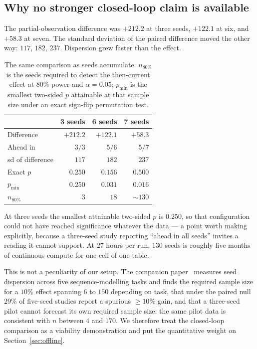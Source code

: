 \documentclass[11pt]{article}
\begin{document}
\subsection{Why no stronger closed-loop claim is available}
\label{sec:power}
The partial-observation difference was $+212.2$ at three seeds,
$+122.1$ at six, and $+58.3$ at seven. The standard deviation of the
paired difference moved the other way: $117$, $182$, $237$. Dispersion
grew faster than the effect.

\begin{table}[h]\centering\small
\caption{The same comparison as seeds accumulate. $n_{80\%}$ is the
seeds required to detect the then-current effect at $80\%$ power and
$\alpha = 0.05$; $p_{\min}$ is the smallest two-sided $p$ attainable at
that sample size under an exact sign-flip permutation test.}
\begin{tabular}{lrrr}
\toprule
& 3 seeds & 6 seeds & 7 seeds \\
\midrule
Difference      & $+212.2$ & $+122.1$ & $+58.3$ \\
Ahead in        & $3/3$    & $5/6$    & $5/7$ \\
sd of difference& $117$    & $182$    & $237$ \\
Exact $p$       & $0.250$  & $0.156$  & $0.500$ \\
$p_{\min}$      & $0.250$  & $0.031$  & $0.016$ \\
$n_{80\%}$      & $3$      & $18$     & $\sim\!130$ \\
\bottomrule
\end{tabular}
\end{table}

At three seeds the smallest attainable two-sided $p$ is $0.250$, so that
configuration could not have reached significance whatever the data ---
a point worth making explicitly, because a three-seed study reporting
``ahead in all seeds'' invites a reading it cannot support. At $27$
hours per run, $130$ seeds is roughly five months of continuous compute
for one cell of one table.

This is not a peculiarity of our setup. The companion
paper~\cite{papera} measures seed dispersion across five sequence-modelling
tasks and finds the required sample size for a $10\%$ effect spanning
$6$ to $150$ depending on task, that under the paired null $29\%$ of
five-seed studies report a spurious $\ge 10\%$ gain, and that a
three-seed pilot cannot forecast its own required sample size: the same
pilot data is consistent with $n$ between $4$ and $170$. We therefore
treat the closed-loop comparison as a viability demonstration and put
the quantitative weight on Section~\ref{sec:offline}.
\end{document}
